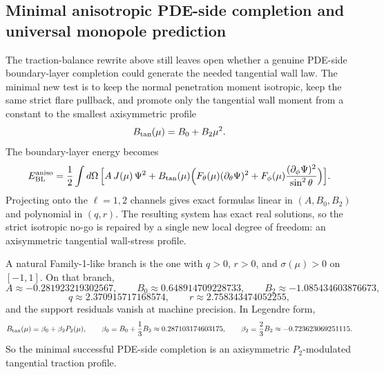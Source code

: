 \documentclass[11pt]{article}
\begin{document}
\subsection{Minimal anisotropic PDE-side completion and universal monopole prediction}
\label{app:family1-aniso}

The traction-balance rewrite above still leaves open whether a genuine PDE-side
boundary-layer completion could generate the needed tangential wall law.  The minimal new
test is to keep the normal penetration moment isotropic, keep the same strict flare
pullback, and promote only the tangential wall moment from a constant to the smallest
axisymmetric profile
\begin{equation}
B_{\rm tan}(\mu)=B_0+B_2\mu^2.
\label{eq:family1-Btan}
\end{equation}
The boundary-layer energy becomes
\begin{equation}
E_{\rm BL}^{\rm aniso}
=
\frac12\int d\Omega\,
\Big[
A\,J(\mu)\,\Psi^2
+
B_{\rm tan}(\mu)
\Big(
F_{\theta}(\mu)(\partial_{\theta}\Psi)^2
+
F_{\phi}(\mu)\frac{(\partial_{\phi}\Psi)^2}{\sin^2\theta}
\Big)
\Big].
\label{eq:family1-aniso-EBL}
\end{equation}
Projecting onto the \(\ell=1,2\) channels gives exact formulas linear in
\((A,B_0,B_2)\) and polynomial in \((q,r)\).  The resulting system has exact real
solutions, so the strict isotropic no-go is repaired by a single new local degree of
freedom: an axisymmetric tangential wall-stress profile.

A natural Family-1-like branch is the one with \(q>0\), \(r>0\), and
\(\sigma(\mu)>0\) on \([-1,1]\).  On that branch,
\begin{equation}
A\approx -0.281923219302567,
\qquad
B_0\approx 0.648914709228733,
\qquad
B_2\approx -1.085434603876673,
\label{eq:family1-familylike-branch-AB}
\end{equation}
\begin{equation}
q\approx 2.370915717168574,
\qquad
r\approx 2.758343474052255,
\label{eq:family1-familylike-branch-qr}
\end{equation}
and the support residuals vanish at machine precision.  In Legendre form,
\begin{equation}
B_{\rm tan}(\mu)=\beta_0+\beta_2 P_2(\mu),
\qquad
\beta_0=B_0+\frac13 B_2\approx 0.287103174603175,
\qquad
\beta_2=\frac23 B_2\approx -0.723623069251115.
\label{eq:family1-beta0-beta2}
\end{equation}
So the minimal successful PDE-side completion is an axisymmetric
\(P_2\)-modulated tangential traction profile.
\end{document}
